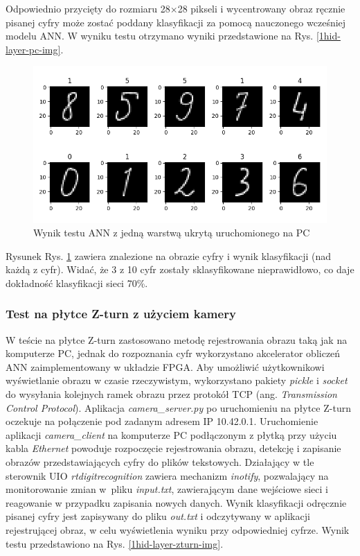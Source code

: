 Odpowiednio przycięty do rozmiaru 28$\times$28 pikseli i wycentrowany obraz ręcznie pisanej cyfry może 
zostać poddany klasyfikacji za pomocą nauczonego wcześniej modelu ANN. W wyniku testu otrzymano 
wyniki przedstawione na Rys. \ref{1hid-layer-pc-img}. 

\begin{figure}[!h]
    \centering
    \includegraphics[width=\textwidth]{img/1hid-layer-pc-plot.png}
    \caption{Wynik testu ANN z jedną warstwą ukrytą uruchomionego na PC}
    \label{1hid-layer-pc-plot}
\end{figure}


Rysunek Rys. \ref{1hid-layer-pc-plot} zawiera znalezione na obrazie cyfry i wynik klasyfikacji (nad 
każdą z cyfr). Widać, że 3 z 10 cyfr zostały sklasyfikowane nieprawidłowo, co daje dokładność 
klasyfikacji sieci 70\%.

\subsubsection{Test na płytce Z-turn z użyciem kamery}

W teście na płytce Z-turn zastosowano metodę rejestrowania obrazu taką jak na komputerze PC, jednak 
do rozpoznania cyfr wykorzystano akcelerator obliczeń ANN zaimplementowany w układzie FPGA.  
Aby umożliwić użytkownikowi wyświetlanie obrazu w czasie rzeczywistym, wykorzystano pakiety \emph{pickle} i \emph{socket} do wysyłania kolejnych ramek obrazu przez protokół TCP (ang. \emph{Transmission Control Protocol}). Aplikacja \emph{camera\_server.py} po uruchomieniu na płytce Z-turn oczekuje na połączenie pod zadanym adresem IP 10.42.0.1. Uruchomienie aplikacji \emph{camera\_client} na komputerze PC podłączonym z płytką przy użyciu kabla \emph{Ethernet} powoduje rozpoczęcie rejestrowania obrazu, detekcję i zapisanie obrazów przedstawiających cyfry do plików tekstowych. Działający w tle sterownik UIO \emph{rtdigitrecognition} zawiera mechanizm \emph{inotify}, pozwalający na monitorowanie zmian w~pliku \emph{input.txt}, zawierającym dane wejściowe sieci i reagowanie w przypadku zapisania nowych danych. Wynik klasyfikacji odręcznie pisanej cyfry jest zapisywany do pliku \emph{out.txt} i odczytywany w aplikacji rejestrującej obraz, w celu wyświetlenia wyniku przy odpowiedniej cyfrze. Wynik testu przedstawiono na Rys. \ref{1hid-layer-zturn-img}.

